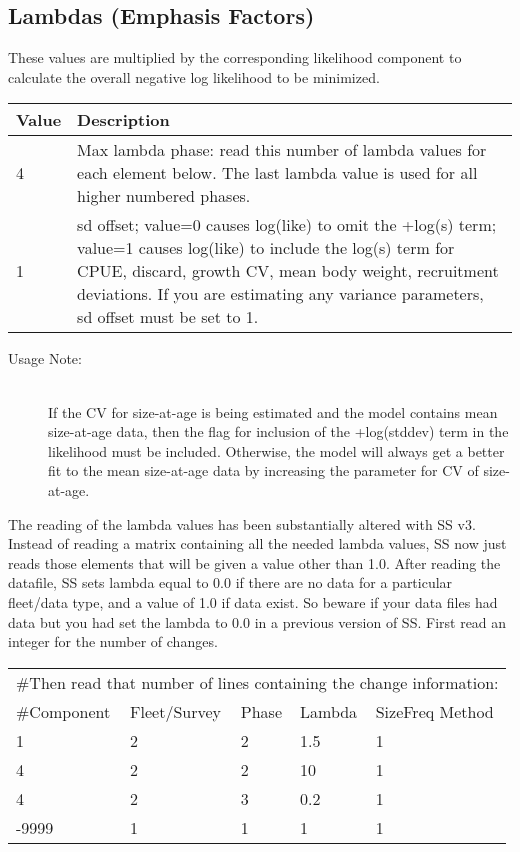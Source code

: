 \subsection{Lambdas (Emphasis Factors)}
These values are multiplied by the corresponding likelihood component to calculate the overall negative log likelihood to be minimized.

\begin{center}
	\begin{tabular}{p{2cm} p{14cm}}
		Value & Description \\
		\hline
		4 & Max lambda phase: read this number of lambda values for each element below.  The last lambda value is used for all higher numbered phases.\\
		1 & sd offset; value=0 causes log(like) to omit the +log(s) term; value=1 causes log(like) to include the log(s) term for CPUE, discard, growth CV, mean body weight, recruitment deviations. If you are estimating any variance parameters, sd offset must be set to 1.  \\
		\hline
	\end{tabular}
\end{center}

\begin{description}
	\item[Usage Note:]\hfil\\
	If the CV for size-at-age is being estimated and the model contains mean size-at-age data, then the flag for inclusion of the +log(stddev) term in the likelihood must be included.  Otherwise, the model will always get a better fit to the mean size-at-age data by increasing the parameter for CV of size-at-age.
\end{description}

The reading of the lambda values has been substantially altered with SS v3.  Instead of reading a matrix containing all the needed lambda values, SS now just reads those elements that will be given a value other than 1.0.  After reading the datafile, SS sets lambda equal to 0.0 if there are no data for a particular fleet/data type, and a value of 1.0 if data exist.  So beware if your data files had data but you had set the lambda to 0.0 in a previous version of SS.  First read an integer for the number of changes.


\begin{center}
	\begin{longtable}{p{3cm} p{3cm} p{2cm} p{3cm} p{3cm}}
		\hline
		\multicolumn{5}{l}{\#Then read that number of lines containing the change information:}\\
		\#Component & Fleet/Survey & Phase & Lambda & SizeFreq Method \\
		\hline
		1 & 2 & 2 & 1.5 & 1 \\
		4 & 2 & 2 & 10 & 1 \\
		4 & 2 & 3 & 0.2 & 1 \\
		-9999 & 1 & 1 & 1 & 1 \\
		\hline
	\end{longtable}
\end{center}


